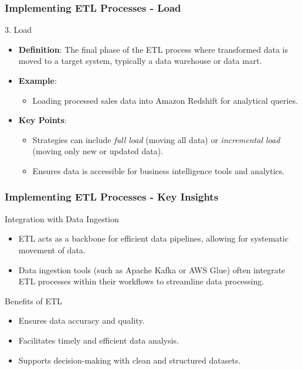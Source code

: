 \documentclass{beamer}
\begin{document}
\begin{frame}[fragile]
    \frametitle{Implementing ETL Processes - Load}
    \begin{block}{3. Load}
        \begin{itemize}
            \item \textbf{Definition}: The final phase of the ETL process where transformed data is moved to a target system, typically a data warehouse or data mart.
            \item \textbf{Example}:
                \begin{itemize}
                    \item Loading processed sales data into Amazon Redshift for analytical queries.
                \end{itemize}
            \item \textbf{Key Points}:
                \begin{itemize}
                    \item Strategies can include \textit{full load} (moving all data) or \textit{incremental load} (moving only new or updated data).
                    \item Ensures data is accessible for business intelligence tools and analytics.
                \end{itemize}
        \end{itemize}
    \end{block}
\end{frame}

\begin{frame}[fragile]
    \frametitle{Implementing ETL Processes - Key Insights}
    \begin{block}{Integration with Data Ingestion}
        \begin{itemize}
            \item ETL acts as a backbone for efficient data pipelines, allowing for systematic movement of data. 
            \item Data ingestion tools (such as Apache Kafka or AWS Glue) often integrate ETL processes within their workflows to streamline data processing.
        \end{itemize}
    \end{block}
    
    \begin{block}{Benefits of ETL}
        \begin{itemize}
            \item Ensures data accuracy and quality.
            \item Facilitates timely and efficient data analysis.
            \item Supports decision-making with clean and structured datasets.
        \end{itemize}
    \end{block}
\end{frame}
\end{document}
